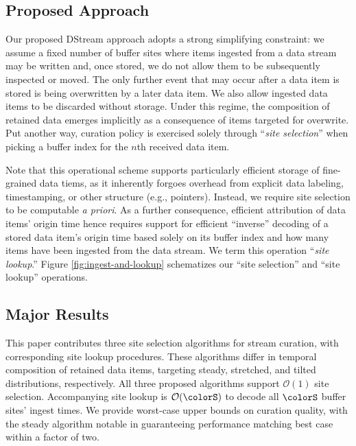 \subsection{Proposed Approach}


Our proposed DStream approach adopts a strong simplifying constraint: we assume a fixed number of buffer sites where items ingested from a data stream may be written and, once stored, we do not allow them to be subsequently inspected or moved.
The only further event that may occur after a data item is stored is being overwritten by a later data item.
We also allow ingested data items to be discarded without storage.
Under this regime, the composition of retained data emerges implicitly as a consequence of items targeted for overwrite.
Put another way, curation policy is exercised solely through ``\textit{site selection}'' when picking a buffer index for the $n$th received data item.

Note that this operational scheme supports particularly efficient storage of fine-grained data tiems, as it inherently forgoes overhead from explicit data labeling, timestamping, or other structure (e.g., pointers).
Instead, we require site selection to be computable \textit{a priori}.
As a further consequence, efficient attribution of data items' origin time hence requires support for efficient ``inverse'' decoding of a stored data item's origin time based solely on its buffer index and how many items have been ingested from the data stream.
We term this operation ``\textit{site lookup}.''
Figure \ref{fig:ingest-and-lookup} schematizes our ``site selection'' and ``site lookup'' operations.



\subsection{Major Results}

This paper contributes three site selection algorithms for stream curation, with corresponding site lookup procedures.
These algorithms differ in temporal composition of retained data items, targeting steady, stretched, and tilted distributions, respectively.
All three proposed algorithms support $\mathcal{O}(1)$ site selection.
Accompanying site lookup is $\mathcal{O}(\colorS)$ to decode all $\colorS$ buffer sites' ingest times.
We provide worst-case upper bounds on curation quality, with the steady algorithm notable in guaranteeing performance matching best case within a factor of two.
